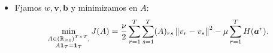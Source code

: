 \documentclass[aspectratio=43]{beamer}
\newcommand{\norm}[1]{\left\lVert#1\right\rVert}
\newcommand{\upper}[1]{\expandafter\MakeUppercase\expandafter{#1}}
\newcommand{\mymat}[1]{\upper{#1}}
\newcommand{\myvec}[1]{\bm{#1}}
\newcommand{\fv}[1]{\myvec{#1}}
\newcommand{\fm}[1]{\mymat{#1}}
\newcommand{\ntasks}{T}
\newcommand{\reals}{\mathbb{R}}
\begin{document}
\begin{frame}
\begin{itemize}
\begin{itemize}
                  \item Fjamos $w, \fv{v}, \fv{b}$ y minimizamos en $A$: 
                  \begin{equation}\nonumber
                        \begin{aligned}
                            \min_{\substack{A \in {(\reals_{\geq 0})}^{\ntasks \times \ntasks}, \\ \fm{A} \fv{1}_\ntasks = \fv{1}_\ntasks}}
                            J(A) = \frac{\nu}{2} \sum_{r=1}^\ntasks \sum_{s=1}^\ntasks (A)_{rs} \norm{{v}_r - v_{s}}^2 - \mu \sum_{r=1}^\ntasks H(\fv{a}^r) .
                        \end{aligned}
                    \end{equation}
            \end{itemize}
            
      \end{itemize}

\end{frame}
\end{document}
